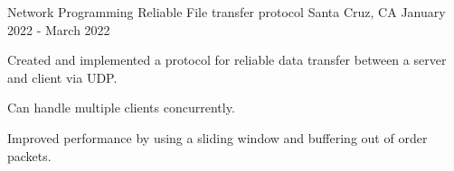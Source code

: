 \begin{cventries}
  \cventry
    {Network Programming}
    {Reliable File transfer protocol}
    {Santa Cruz, CA}
    {January 2022 - March 2022}
    {
        \begin{cvitems}
            \item {Created and implemented a protocol for reliable data transfer between a server and client via UDP.}
            \item {Can handle multiple clients concurrently.}
            \item {Improved performance by using a sliding window and buffering out of order packets.}        \end{cvitems}
    }

\end{cventries}